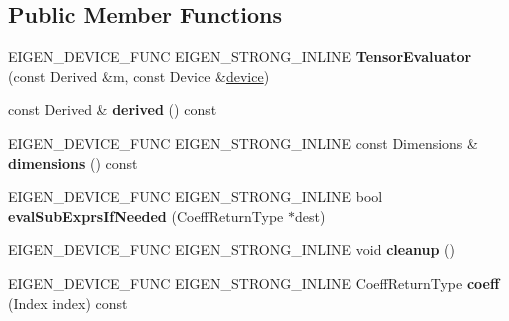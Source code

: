 \subsection*{Public Member Functions}
\begin{DoxyCompactItemize}
\item 
\mbox{\label{struct_eigen_1_1_tensor_evaluator_a43bea98dc719e3b6ac73ab2df0291455}} 
E\+I\+G\+E\+N\+\_\+\+D\+E\+V\+I\+C\+E\+\_\+\+F\+U\+NC E\+I\+G\+E\+N\+\_\+\+S\+T\+R\+O\+N\+G\+\_\+\+I\+N\+L\+I\+NE {\bfseries Tensor\+Evaluator} (const Derived \&m, const Device \&\hyperlink{struct_eigen_1_1_tensor_evaluator_a98b51809ed8f7a1f736eb7b952b9636e}{device})
\item 
\mbox{\label{struct_eigen_1_1_tensor_evaluator_aabcd5bdca16b32dd86ebddd3b37b1f6c}} 
const Derived \& {\bfseries derived} () const
\item 
\mbox{\label{struct_eigen_1_1_tensor_evaluator_af32e0f48e24581602b66e9d33af58c85}} 
E\+I\+G\+E\+N\+\_\+\+D\+E\+V\+I\+C\+E\+\_\+\+F\+U\+NC E\+I\+G\+E\+N\+\_\+\+S\+T\+R\+O\+N\+G\+\_\+\+I\+N\+L\+I\+NE const Dimensions \& {\bfseries dimensions} () const
\item 
\mbox{\label{struct_eigen_1_1_tensor_evaluator_ae188d806978166eb8cbffbd63c944fb3}} 
E\+I\+G\+E\+N\+\_\+\+D\+E\+V\+I\+C\+E\+\_\+\+F\+U\+NC E\+I\+G\+E\+N\+\_\+\+S\+T\+R\+O\+N\+G\+\_\+\+I\+N\+L\+I\+NE bool {\bfseries eval\+Sub\+Exprs\+If\+Needed} (Coeff\+Return\+Type $\ast$dest)
\item 
\mbox{\label{struct_eigen_1_1_tensor_evaluator_a76ec54bcca9523ec104aaa9adaf74983}} 
E\+I\+G\+E\+N\+\_\+\+D\+E\+V\+I\+C\+E\+\_\+\+F\+U\+NC E\+I\+G\+E\+N\+\_\+\+S\+T\+R\+O\+N\+G\+\_\+\+I\+N\+L\+I\+NE void {\bfseries cleanup} ()
\item 
\mbox{\label{struct_eigen_1_1_tensor_evaluator_a7747e4223120fe698801fa12c186561d}} 
E\+I\+G\+E\+N\+\_\+\+D\+E\+V\+I\+C\+E\+\_\+\+F\+U\+NC E\+I\+G\+E\+N\+\_\+\+S\+T\+R\+O\+N\+G\+\_\+\+I\+N\+L\+I\+NE Coeff\+Return\+Type {\bfseries coeff} (Index index) const
\item 
\mbox{\label{struct_eigen_1_1_tensor_evaluator_ac3af69e412d8b4f1e65fcca48e08db26}} 

\end{DoxyCompactItemize}
